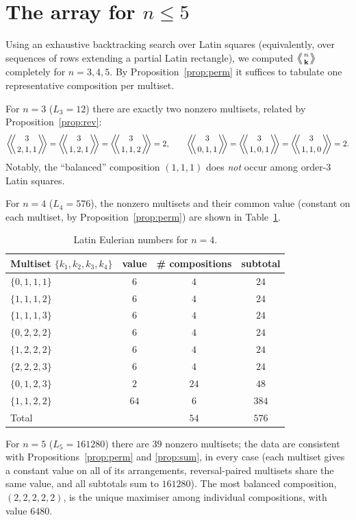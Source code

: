 \documentclass[11pt]{amsart}
\newcommand{\LE}[1]{\left\langle\!\!\left\langle #1 \right\rangle\!\!\right\rangle}
\begin{document}
\section{The array for $n\le 5$}

Using an exhaustive backtracking search over Latin squares (equivalently, over sequences of rows extending a partial Latin rectangle), we computed $\LE{n\atop\mathbf k}$ completely for $n=3,4,5$. By Proposition~\ref{prop:perm} it suffices to tabulate one representative composition per multiset.

For $n=3$ ($L_3=12$) there are exactly two nonzero multisets, related by Proposition~\ref{prop:rev}:
\[
\LE{3\atop 2,1,1}=\LE{3\atop 1,2,1}=\LE{3\atop 1,1,2}=2,\qquad
\LE{3\atop 0,1,1}=\LE{3\atop 1,0,1}=\LE{3\atop 1,1,0}=2.
\]
Notably, the ``balanced'' composition $(1,1,1)$ does \emph{not} occur among order-$3$ Latin squares.

For $n=4$ ($L_4=576$), the nonzero multisets and their common value (constant on each multiset, by Proposition~\ref{prop:perm}) are shown in Table~\ref{tab:n4}.

\begin{table}[h]
\centering
\begin{tabular}{@{}lccc@{}}
\toprule
Multiset $\{k_1,k_2,k_3,k_4\}$ & value & \# compositions & subtotal \\
\midrule
$\{0,1,1,1\}$ & $6$ & $4$ & $24$ \\
$\{1,1,1,2\}$ & $6$ & $4$ & $24$ \\
$\{1,1,1,3\}$ & $6$ & $4$ & $24$ \\
$\{0,2,2,2\}$ & $6$ & $4$ & $24$ \\
$\{1,2,2,2\}$ & $6$ & $4$ & $24$ \\
$\{2,2,2,3\}$ & $6$ & $4$ & $24$ \\
$\{0,1,2,3\}$ & $2$ & $24$ & $48$ \\
$\{1,1,2,2\}$ & $64$ & $6$ & $384$ \\
\midrule
Total & & $54$ & $576$ \\
\bottomrule
\end{tabular}
\caption{Latin Eulerian numbers for $n=4$.}
\label{tab:n4}
\end{table}

For $n=5$ ($L_5=161280$) there are $39$ nonzero multisets; the data are consistent with Propositions~\ref{prop:perm} and \ref{prop:sum}, in every case (each multiset gives a constant value on all of its arrangements, reversal-paired multisets share the same value, and all subtotals sum to $161280$). The most balanced composition, $(2,2,2,2,2)$, is the unique maximiser among individual compositions, with value $6480$.
\end{document}
